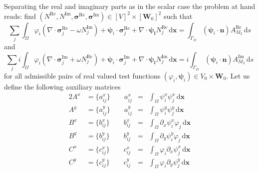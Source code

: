 \documentclass[11pt,a4paper]{article}
\begin{document}
Separating the real and imaginary parts as in the scalar case the problem at hand reads: find $(N^\textrm{Re},N^\textrm{Im},\boldsymbol{\sigma}^\textrm{Re},\boldsymbol{\sigma}^\textrm{Im})\in [V]^2\times [\mathbf{W}_0]^2$ such that
\begin{equation}
\sum_j\int_\Omega \varphi_i\left(\nabla\cdot\boldsymbol{\sigma}_j^\textrm{Re}-\omega N^\textrm{Im}_j\right)+
\boldsymbol{\psi}_i\cdot\boldsymbol{\sigma}^\textrm{Re}_j+
\nabla\cdot\boldsymbol{\psi_i}N_j^\textrm{Re}\,\mathrm{d}\mathbf{x}=
\int_{\Gamma_D}(\boldsymbol{\psi}_i\cdot\mathbf{n})A^\textrm{Re}_{M_2}\,\mathrm{d}s
\end{equation}
and
\begin{equation}
\sum_ji\int_\Omega \varphi_i\left(\nabla\cdot\boldsymbol{\sigma}_j^\textrm{Im}+\omega N^\textrm{Re}_j\right)+
\boldsymbol{\psi}_i\cdot\boldsymbol{\sigma}^\textrm{Im}_j+
\nabla\cdot\boldsymbol{\psi_i}N_j^\textrm{Im}\,\mathrm{d}\mathbf{x}=
i\int_{\Gamma_D}(\boldsymbol{\psi}_i\cdot\mathbf{n})A^\textrm{Im}_{M_2}\,\mathrm{d}s
\end{equation}
for all admissible pairs of real valued test functions $(\varphi_i,\boldsymbol{\psi}_i)\in V_{0}\times\mathbf{W}_0$.
Let us define the following auxiliary matrices
\begin{alignat}{2}
A^x&=\{a^x_{ij}\} \qquad a^x_{ij}&=&\int_\Omega \psi^x_i\psi^x_j\,\mathrm{d}\mathbf{x}\\
A^y&=\{a^y_{ij}\} \qquad a^y_{ij}&=&\int_\Omega \psi^y_i\psi^y_j\,\mathrm{d}\mathbf{x}\\
B^x&=\{b^x_{ij}\} \qquad b^x_{ij}&=&\int_\Omega \partial_x\psi^x_i\varphi_j\,\mathrm{d}\mathbf{x}\\
B^y&=\{b^y_{ij}\} \qquad b^y_{ij}&=&\int_\Omega \partial_y\psi^y_i\varphi_j\,\mathrm{d}\mathbf{x}\\
C^x&=\{c^x_{ij}\} \qquad c^x_{ij}&=&\int_\Omega \varphi_i\partial_x\psi^x_j\,\mathrm{d}\mathbf{x}\\
C^y&=\{c^y_{ij}\} \qquad c^y_{ij}&=&\int_\Omega \varphi_i\partial_y\psi^y_j\,\mathrm{d}\mathbf{x}
\end{alignat}
\end{document}
